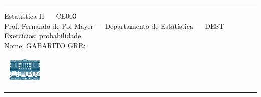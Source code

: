 \documentclass[a4paper,11pt,fleqn]{article}\usepackage[]{graphicx}\usepackage[]{color}
\theoremstyle{definition}
\begin{document}
\reversemarginpar %





\hrule
\vspace{0.3cm}

\begin{minipage}[c]{.85\textwidth}
  Estatística II --- CE003 \\
  Prof. Fernando de Pol Mayer --- Departamento de Estatística --- DEST \\
  Exercícios: probabilidade \\
  Nome: GABARITO   \hfill GRR: \hspace{2cm}
\end{minipage}\hfill
\begin{minipage}[c]{.15\textwidth}
\flushright
\includegraphics[width=2.2cm]{../img/ufpr-logo.png}
\end{minipage}

\vspace{0.3cm}
\hrule
\vspace{0.3cm}
\end{document}
